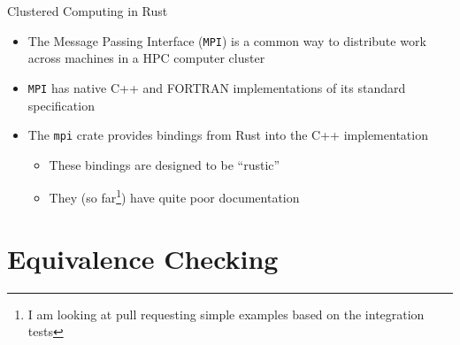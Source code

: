\documentclass[10pt,aspectratio=169]{beamer}
\begin{document}
\begin{frame}{Clustered Computing in Rust}
    \begin{itemize}
        \item The Message Passing Interface (\texttt{MPI}) is a common way to distribute work across machines in a HPC computer cluster
        \item \texttt{MPI} has native C++ and FORTRAN implementations of its standard specification
        \item The \texttt{mpi} crate provides bindings from Rust into the C++ implementation
        \begin{itemize}
            \item These bindings are designed to be ``rustic''
            \item They (so far\footnote{I am looking at pull requesting simple examples based on the integration tests}) have quite poor documentation
        \end{itemize}
    \end{itemize}
\end{frame}





\section{Equivalence Checking}
\end{document}
